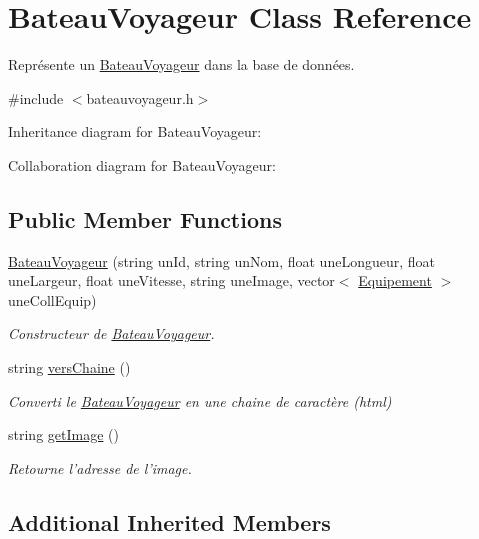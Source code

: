 \hypertarget{class_bateau_voyageur}{\section{Bateau\-Voyageur Class Reference}
\label{class_bateau_voyageur}
}


Représente un \hyperlink{class_bateau_voyageur}{Bateau\-Voyageur} dans la base de données.  




{\ttfamily \#include $<$bateauvoyageur.\-h$>$}



Inheritance diagram for Bateau\-Voyageur\-:


Collaboration diagram for Bateau\-Voyageur\-:
\subsection*{Public Member Functions}
\begin{DoxyCompactItemize}
\item 
\hyperlink{class_bateau_voyageur_a1b1cebac99ff69d94e827dd2d57129b5}{Bateau\-Voyageur} (string un\-Id, string un\-Nom, float une\-Longueur, float une\-Largeur, float une\-Vitesse, string une\-Image, vector$<$ \hyperlink{class_equipement}{Equipement} $>$ une\-Coll\-Equip)
\begin{DoxyCompactList}\small\item\em Constructeur de \hyperlink{class_bateau_voyageur}{Bateau\-Voyageur}. \end{DoxyCompactList}\item 
string \hyperlink{class_bateau_voyageur_a1852a84318445d934402323cf35411b1}{vers\-Chaine} ()
\begin{DoxyCompactList}\small\item\em Converti le \hyperlink{class_bateau_voyageur}{Bateau\-Voyageur} en une chaine de caractère (html) \end{DoxyCompactList}\item 
string \hyperlink{class_bateau_voyageur_ae7aa861deee2bad97e5ad00632f7c0ec}{get\-Image} ()
\begin{DoxyCompactList}\small\item\em Retourne l'adresse de l'image. \end{DoxyCompactList}\end{DoxyCompactItemize}
\subsection*{Additional Inherited Members}


